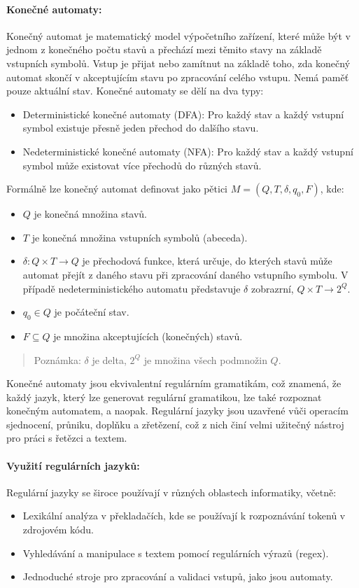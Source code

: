 \paragraph*{Konečné automaty:} 

Konečný automat je matematický model výpočetního zařízení, které může být v jednom z 
konečného počtu stavů a přechází mezi těmito stavy na základě vstupních symbolů.
Vstup je přijat nebo zamítnut na základě toho, zda konečný automat skončí v 
akceptujícím stavu po zpracování celého vstupu. Nemá paměť pouze aktuální stav.
Konečné automaty se dělí na dva typy:
\begin{itemize}
\item Deterministické konečné automaty (DFA): Pro každý stav a každý vstupní symbol existuje
přesně jeden přechod do dalšího stavu.
\item Nedeterministické konečné automaty (NFA): Pro každý stav a každý vstupní symbol může existovat více přechodů do různých stavů.
\end{itemize}

Formálně lze konečný automat definovat jako pětici $M = (Q, T, \delta, q_0, F)$, kde:
\begin{itemize}
\item $Q$ je konečná množina stavů.
\item $T$ je konečná množina vstupních symbolů (abeceda).
\item $\delta: Q \times T \to Q$ je přechodová funkce, která určuje, do kterých stavů 
může automat přejít z daného stavu při zpracování daného vstupního symbolu.
V případě nedeterministického automatu představuje $\delta$ zobrazrní, $Q \times T \to 2^Q$.
\item $q_0 \in Q$ je počáteční stav.
\item $F \subseteq Q$ je množina akceptujících (konečných) stavů.
\end{itemize}
\begin{quote}
    Poznámka: $\delta$ je delta, $2^Q$ je množina všech podmnožin $Q$.
\end{quote}
Konečné automaty jsou ekvivalentní regulárním gramatikám, což znamená, že každý jazyk, 
který lze generovat regulární gramatikou, lze také rozpoznat konečným automatem, a 
naopak. Regulární jazyky jsou uzavřené vůči operacím sjednocení, průniku, doplňku a 
zřetězení, což z nich činí velmi užitečný nástroj pro práci s řetězci a textem.

\paragraph*{Využití regulárních jazyků:} Regulární jazyky se široce používají v 
různých oblastech informatiky, včetně:
\begin{itemize}
\item Lexikální analýza v překladačích, kde se používají k rozpoznávání tokenů v 
zdrojovém kódu.
\item Vyhledávání a manipulace s textem pomocí regulárních výrazů (regex).
\item Jednoduché stroje pro zpracování a validaci vstupů, jako jsou automaty.
\end{itemize}

